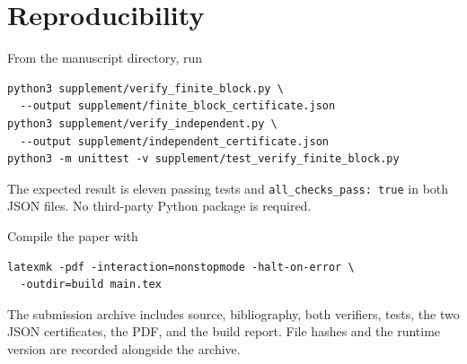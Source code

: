 \section{Reproducibility}\label{app:reproducibility}

From the manuscript directory, run
\begin{verbatim}
python3 supplement/verify_finite_block.py \
  --output supplement/finite_block_certificate.json
python3 supplement/verify_independent.py \
  --output supplement/independent_certificate.json
python3 -m unittest -v supplement/test_verify_finite_block.py
\end{verbatim}
The expected result is eleven passing tests and
\texttt{all\_checks\_pass: true} in both JSON files.  No third-party Python
package is required.

Compile the paper with
\begin{verbatim}
latexmk -pdf -interaction=nonstopmode -halt-on-error \
  -outdir=build main.tex
\end{verbatim}
The submission archive includes source, bibliography, both verifiers, tests,
the two JSON certificates, the PDF, and the build report.  File hashes and the
runtime version are recorded alongside the archive.
